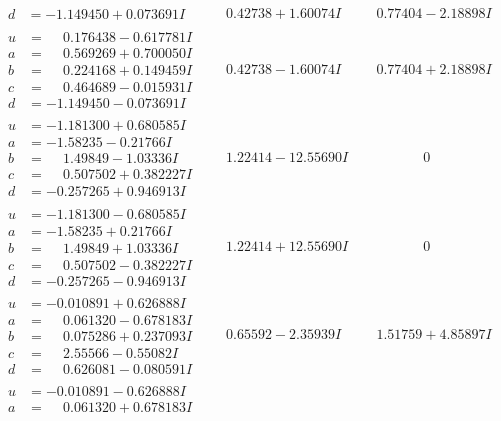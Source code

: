 \documentclass[1p]{elsarticle_modified}
\theoremstyle{definition}
\begin{document}
$$\begin{array}{c|c|c}
\begin{aligned}
d &= -1.149450 + 0.073691 I\end{aligned}
 & \phantom{-}0.42738 + 1.60074 I & \phantom{-}0.77404 - 2.18898 I \\ \hline\begin{aligned}
u &= \phantom{-}0.176438 - 0.617781 I \\
a &= \phantom{-}0.569269 + 0.700050 I \\
b &= \phantom{-}0.224168 + 0.149459 I \\
c &= \phantom{-}0.464689 - 0.015931 I \\
d &= -1.149450 - 0.073691 I\end{aligned}
 & \phantom{-}0.42738 - 1.60074 I & \phantom{-}0.77404 + 2.18898 I \\ \hline\begin{aligned}
u &= -1.181300 + 0.680585 I \\
a &= -1.58235 - 0.21766 I \\
b &= \phantom{-}1.49849 - 1.03336 I \\
c &= \phantom{-}0.507502 + 0.382227 I \\
d &= -0.257265 + 0.946913 I\end{aligned}
 & \phantom{-}1.22414 - 12.55690 I & \phantom{-0.000000 } 0 \\ \hline\begin{aligned}
u &= -1.181300 - 0.680585 I \\
a &= -1.58235 + 0.21766 I \\
b &= \phantom{-}1.49849 + 1.03336 I \\
c &= \phantom{-}0.507502 - 0.382227 I \\
d &= -0.257265 - 0.946913 I\end{aligned}
 & \phantom{-}1.22414 + 12.55690 I & \phantom{-0.000000 } 0 \\ \hline\begin{aligned}
u &= -0.010891 + 0.626888 I \\
a &= \phantom{-}0.061320 - 0.678183 I \\
b &= \phantom{-}0.075286 + 0.237093 I \\
c &= \phantom{-}2.55566 - 0.55082 I \\
d &= \phantom{-}0.626081 - 0.080591 I\end{aligned}
 & \phantom{-}0.65592 - 2.35939 I & \phantom{-}1.51759 + 4.85897 I \\ \hline\begin{aligned}
u &= -0.010891 - 0.626888 I \\
a &= \phantom{-}0.061320 + 0.678183 I \\

\end{aligned}
\end{array}$$
\end{document}
